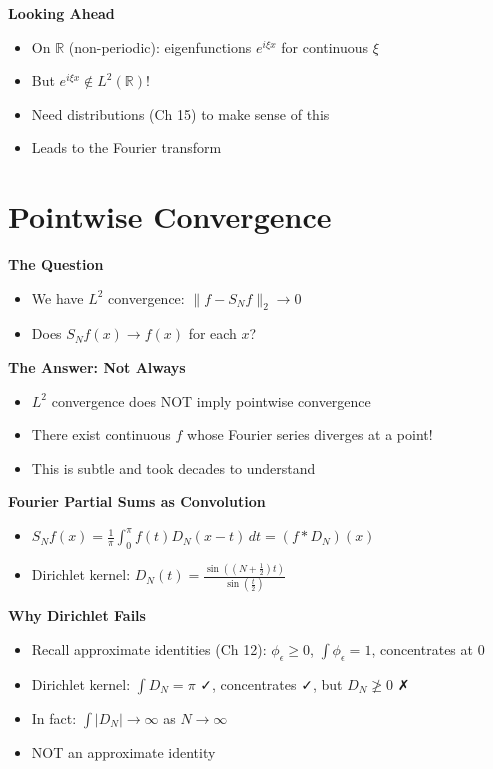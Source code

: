 \documentclass[
  10pt,
  letterpaper,
]{scrbook}
\providecommand{\tightlist}{%
  \setlength{\itemsep}{0pt}\setlength{\parskip}{0pt}}
\begin{document}
\textbf{Looking Ahead}

\begin{itemize}
\tightlist
\item
  On \(\mathbb{R}\) (non-periodic): eigenfunctions \(e^{i\xi x}\) for
  continuous \(\xi\)
\item
  But \(e^{i\xi x} \notin L^2(\mathbb{R})\)!
\item
  Need distributions (Ch 15) to make sense of this
\item
  Leads to the Fourier transform
\end{itemize}

\section{Pointwise Convergence}\label{pointwise-convergence}

\textbf{The Question}

\begin{itemize}
\tightlist
\item
  We have \(L^2\) convergence: \(\|f - S_N f\|_2 \to 0\)
\item
  Does \(S_N f(x) \to f(x)\) for each \(x\)?
\end{itemize}

\textbf{The Answer: Not Always}

\begin{itemize}
\tightlist
\item
  \(L^2\) convergence does NOT imply pointwise convergence
\item
  There exist continuous \(f\) whose Fourier series diverges at a point!
\item
  This is subtle and took decades to understand
\end{itemize}

\textbf{Fourier Partial Sums as Convolution}

\begin{itemize}
\tightlist
\item
  \(S_N f(x) = \frac{1}{\pi}\int_0^\pi f(t) D_N(x-t)\, dt = (f * D_N)(x)\)
\item
  Dirichlet kernel:
  \(D_N(t) = \frac{\sin((N+\frac{1}{2})t)}{\sin(\frac{t}{2})}\)
\end{itemize}

\textbf{Why Dirichlet Fails}

\begin{itemize}
\tightlist
\item
  Recall approximate identities (Ch 12): \(\phi_\epsilon \geq 0\),
  \(\int \phi_\epsilon = 1\), concentrates at 0
\item
  Dirichlet kernel: \(\int D_N = \pi\) ✓, concentrates ✓, but
  \(D_N \not\geq 0\) ✗
\item
  In fact: \(\int |D_N| \to \infty\) as \(N \to \infty\)
\item
  NOT an approximate identity
\end{itemize}
\end{document}
